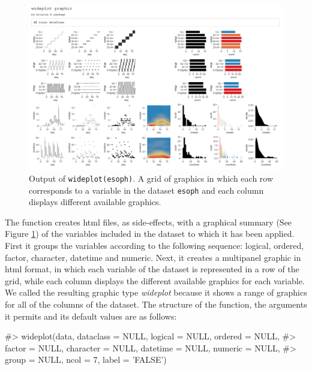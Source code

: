 \begin{Schunk}
\begin{figure}[H]
\includegraphics[width=0.95\linewidth]{figures/wideplot_esoph} \caption[Output of 'wideplot(esoph)']{Output of \texttt{wideplot(esoph)}. A grid of graphics in which each row corresponds to a variable in the dataset \texttt{esoph} and each column displays different available graphics.}\label{fig:wideplotesoph}
\end{figure}
\end{Schunk}

The  function creates html files, as side-effects, with
a graphical summary (See Figure \ref{fig:wideplotesoph}) of the
variables included in the dataset to which it has been applied. First it
groups the variables according to the following sequence: logical,
ordered, factor, character, datetime and numeric. Next, it creates a
multipanel graphic in html format, in which each variable of
the dataset is represented in a row of the grid, while each column
displays the different available graphics for each variable. We called
the resulting graphic type \emph{wideplot} because it shows a range of 
graphics for all of the columns of the dataset. The structure of the 
function, the arguments it permits and its default values are as follows:

\begin{Schunk}
\begin{Soutput}
#> wideplot(data, dataclass = NULL, logical = NULL, ordered = NULL,
#>   factor = NULL, character = NULL, datetime = NULL, numeric = NULL,
#>   group = NULL, ncol = 7, label = 'FALSE')
\end{Soutput}
\end{Schunk}

